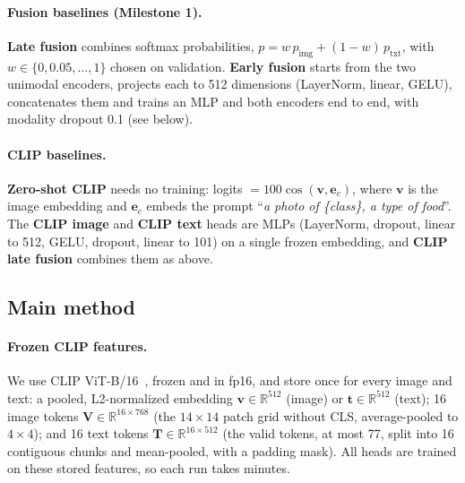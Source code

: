 \documentclass[11pt,a4paper]{article}
\begin{document}
\paragraph{Fusion baselines (Milestone 1).}
\textbf{Late fusion} combines softmax probabilities, $p = w\,p_{\text{img}} + (1-w)\,p_{\text{txt}}$, with
$w\in\{0,0.05,\dots,1\}$ chosen on validation. \textbf{Early fusion} starts from the two unimodal encoders,
projects each to 512 dimensions (LayerNorm, linear, GELU), concatenates them and trains an MLP and both encoders end
to end, with modality dropout 0.1 (see below).

\paragraph{CLIP baselines.}
\textbf{Zero-shot CLIP} needs no training: logits $=100\cos(\mathbf{v},\mathbf{e}_c)$, where $\mathbf{v}$ is the
image embedding and $\mathbf{e}_c$ embeds the prompt ``\emph{a photo of \{class\}, a type of food}''. The
\textbf{CLIP image} and \textbf{CLIP text} heads are MLPs (LayerNorm, dropout, linear to 512, GELU, dropout, linear
to 101) on a single frozen embedding, and \textbf{CLIP late fusion} combines them as above.

\subsection{Main method}

\paragraph{Frozen CLIP features.}
We use CLIP ViT-B/16~\cite{radford2021clip}, frozen and in fp16, and store once for every image and text: a pooled,
L2-normalized embedding $\mathbf{v}\in\mathbb{R}^{512}$ (image) or $\mathbf{t}\in\mathbb{R}^{512}$ (text); 16 image
tokens $\mathbf{V}\in\mathbb{R}^{16\times768}$ (the $14\times14$ patch grid without CLS, average-pooled to
$4\times4$); and 16 text tokens $\mathbf{T}\in\mathbb{R}^{16\times512}$ (the valid tokens, at most 77, split into 16
contiguous chunks and mean-pooled, with a padding mask). All heads are trained on these stored features, so each
run takes minutes.
\end{document}
